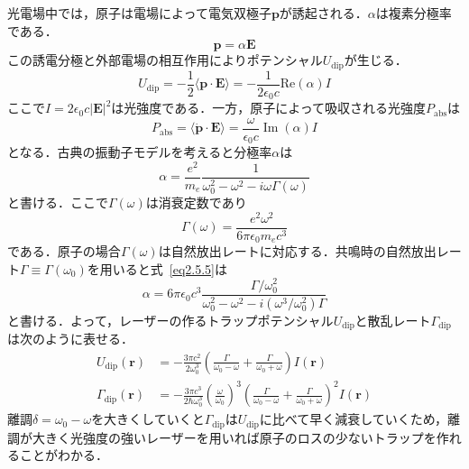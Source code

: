 \documentclass[11pt,a4j,notitlepage]{jreport}
\newcommand{\eq}[1]{式~\eqref{#1}}	%
\begin{document}
光電場中では，原子は電場によって電気双極子$\bm{p}$が誘起される．$\alpha$は複素分極率である．
\begin{equation}
	\bm{p} = \alpha \bm{E}
	\label{eq2.5.2}
\end{equation}
この誘電分極と外部電場の相互作用によりポテンシャル$U_{\mathrm{dip}}$が生じる．
\begin{equation}
	U_{\mathrm{dip}}=-\frac{1}{2}\langle \bm{p} \cdot \bm{E} \rangle=-\frac{1}{2 \epsilon_{0} c} \mathrm{Re}(\alpha) I
	\label{eq2.5.3}
\end{equation}
ここで$I=2 \epsilon_{0} c|\bm{E}|^{2}$は光強度である．一方，原子によって吸収される光強度$P_{\mathrm{abs}}$は
\begin{equation}
	P_{\mathrm{abs}}=\langle \dot{\bm{p}} \cdot \bm{E} \rangle=\frac{\omega}{\epsilon_{0} c} \operatorname{Im}(\alpha) I
	\label{eq2.5.4}
\end{equation}
となる．古典の振動子モデルを考えると分極率$\alpha$は
\begin{equation}
	\alpha=\frac{e^{2}}{m_{e}} \frac{1}{\omega_{0}^{2}-\omega^{2}-i \omega \Gamma(\omega)}
	\label{eq2.5.5}
\end{equation}
と書ける．ここで$\Gamma(\omega)$は消衰定数であり
\begin{equation}
	\Gamma(\omega)=\frac{e^{2} \omega^{2}}{6 \pi \epsilon_{0} m_{e} c^{3}}
	\label{eq2.5.6}
\end{equation}
である．原子の場合$\Gamma(\omega)$は自然放出レートに対応する．共鳴時の自然放出レート$\Gamma \equiv \Gamma\left(\omega_{0}\right)$を用いると\eq{eq2.5.5}は
\begin{equation}
	\alpha=6 \pi \epsilon_{0} c^{3} \frac{\Gamma / \omega_{0}^{2}}{\omega_{0}^{2}-\omega^{2}-i\left(\omega^{3} / \omega_{0}^{2}\right) \Gamma}
	\label{eq2.5.7}
\end{equation}
と書ける．よって，レーザーの作るトラップポテンシャル$U_{\mathrm{dip}}$と散乱レート$\Gamma_{\mathrm{dip}}$は次のように表せる．
\begin{align}
	U_{\mathrm{dip}}(\bm{r})
	& = -\frac{3 \pi c^{2}}{2 \omega_{0}^{3}}\left(\frac{\Gamma}{\omega_{0}-\omega}+\frac{\Gamma}{\omega_{0}+\omega}\right) I(\bm{r})
	\label{eq2.5.8} \\
	\Gamma_{\mathrm{dip}}(\bm{r})
	& = -\frac{3 \pi c^{3}}{2 \hbar \omega_{0}^{3}}\left(\frac{\omega}{\omega_{0}}\right)^{3}\left(\frac{\Gamma}{\omega_{0}-\omega}+\frac{\Gamma}{\omega_{0}+\omega}\right)^{2} I(\bm{r})
	\label{eq2.5.9}
\end{align}
離調$\delta=\omega_{0}-\omega$を大きくしていくと$\Gamma_{\mathrm{dip}}$は$U_{\mathrm{dip}}$に比べて早く減衰していくため，離調が大きく光強度の強いレーザーを用いれば原子のロスの少ないトラップを作れることがわかる．
\end{document}
